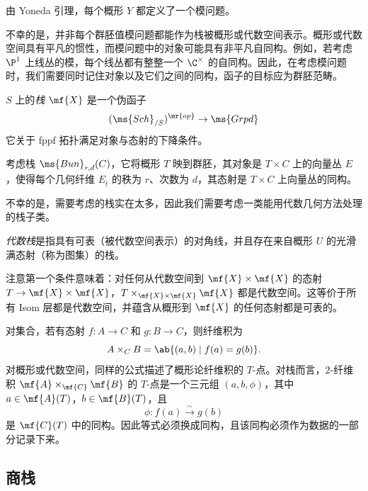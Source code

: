 \begin{exm}
    由 Yoneda 引理，每个概形 \(Y\) 都定义了一个模问题。
\end{exm}

不幸的是，并非每个群胚值模问题都能作为栈被概形或代数空间表示。概形或代数空间具有平凡的惯性，而模问题中的对象可能具有非平凡自同构。例如，若考虑 \(\P^1\) 上线丛的模，每个线丛都有整整一个 \(\C^{\times}\) 的自同构。因此，在考虑模问题时，我们需要同时记住对象以及它们之间的同构，函子的目标应为群胚范畴。

\begin{defn}[informal]
    \(S\) 上的\textit{栈} \(\mf{X}\) 是一个伪函子
    \[ (\ms{Sch}_{/S})^{\mr{op}} \to \ms{Grpd} \]
    它关于 fppf 拓扑满足对象与态射的下降条件。
\end{defn}

\begin{exm}
    考虑栈 \(\ms{Bun}_{r,d}(C)\)，它将概形 \(T\) 映到群胚，其对象是 \(T\times C\) 上的向量丛 \(E\)，使得每个几何纤维 \(E_{\bar t}\) 的秩为 \(r\)、次数为 \(d\)，其态射是 \(T\times C\) 上向量丛的同构。
\end{exm}

不幸的是，需要考虑的栈实在太多，因此我们需要考虑一类能用代数几何方法处理的栈子类。

\begin{defn}
    \textit{代数栈}是指具有可表（被代数空间表示）的对角线，并且存在来自概形 \(U\) 的光滑满态射（称为图集）的栈。
\end{defn}

注意第一个条件意味着：对任何从代数空间到 \(\mf{X} \times \mf{X}\) 的态射 \(T \to \mf{X} \times \mf{X}\)，\(T \times_{\mf{X} \times \mf{X}} \mf{X}\) 都是代数空间。这等价于所有 Isom 层都是代数空间，并蕴含从概形到 \(\mf{X}\) 的任何态射都是可表的。

\begin{rmk}
    对集合，若有态射 \(f\colon A\to C\) 和 \(g\colon B\to C\)，则纤维积为
    \[ 
        A\times_C B=\ab\{(a,b)\mid f(a)=g(b)\}. 
    \] 
    对概形或代数空间，同样的公式描述了概形论纤维积的 \(T\)-点。对栈而言，\(2\)-纤维积 \(\mf{A}\times_{\mf{C}}\mf{B}\) 的 \(T\)-点是一个三元组 \((a,b,\phi)\)，其中 \(a\in\mf{A}(T)\)，\(b\in\mf{B}(T)\)，且
    \[ 
        \phi\colon f(a)\xrightarrow{\sim}g(b) 
    \]
    是 \(\mf{C}(T)\) 中的同构。因此等式必须换成同构，且该同构必须作为数据的一部分记录下来。
\end{rmk}


\subsection{商栈}%
\label{sub:Quotient stacks}

